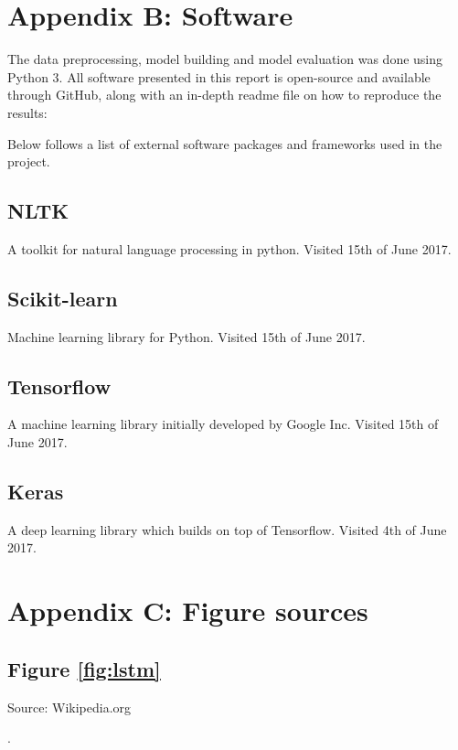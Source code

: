 \documentclass[a4paper]{article}
\begin{document}
\pagebreak
\section{Appendix B: Software}
\label{app:B}
The data preprocessing, model building and model evaluation was done using
Python 3.
All software presented in this report is open-source and available through
GitHub, along with an in-depth readme file on how
to reproduce the results:


Below follows a list of external software packages and frameworks used in
the project.

\subsection{NLTK}
A toolkit for natural language processing in python. Visited 15th of June 2017.


\subsection{Scikit-learn}
Machine learning library for Python. Visited 15th of June 2017.


\subsection{Tensorflow}
A machine learning library initially developed by Google Inc.
Visited 15th of June 2017.


\subsection{Keras}
A deep learning library which builds on top of Tensorflow.
Visited 4th of June 2017.


\pagebreak
\section{Appendix C: Figure sources}
\subsection{Figure \ref{fig:lstm}}
Source: Wikipedia.org

.
\end{document}
